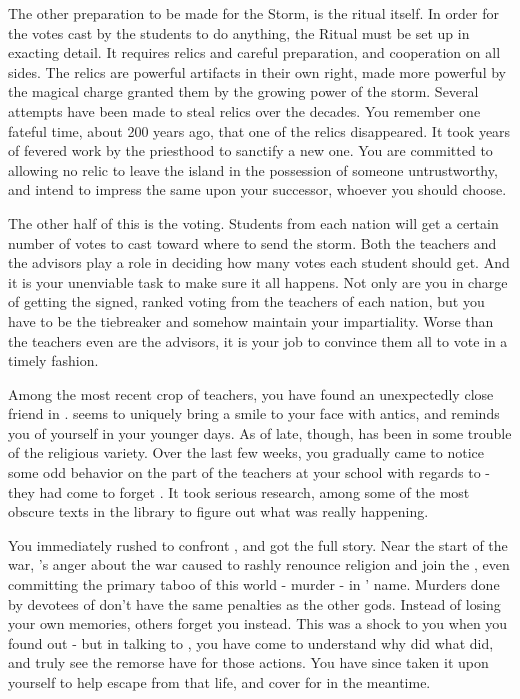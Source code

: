 \documentclass[char]{GL2020}
\begin{document}
The other preparation to be made for the Storm, is the ritual itself. In order for the votes cast by the students to do anything, the Ritual must be set up in exacting detail. It requires relics and careful preparation, and cooperation on all sides. The relics are powerful artifacts in their own right, made more powerful by the magical charge granted them by the growing power of the storm. Several attempts have been made to steal relics over the decades. You remember one fateful time, about 200 years ago, that one of the \pFarm{} relics disappeared. It took years of fevered work by the priesthood to sanctify a new one. You are committed to allowing no relic to leave the island in the possession of someone untrustworthy, and intend to impress the same upon your successor, whoever you should choose.

The other half of this is the voting. Students from each nation will get a certain number of votes to cast toward where to send the storm. Both the teachers and the advisors play a role in deciding how many votes each student should get. And it is your unenviable task to make sure it all happens. Not only are you in charge of getting the signed, ranked voting from the teachers of each nation, but you have to be the tiebreaker and somehow maintain your impartiality. Worse than the teachers even are the advisors, it is your job to convince them all to vote in a timely fashion.

Among the most recent crop of teachers, you have found an unexpectedly close friend in \cChupAvenger{}. \cChupAvenger{} seems to uniquely bring a smile to your face with \cChupAvenger{\their} antics, and reminds you of yourself in your younger days. As of late, though, \cChupAvenger{} has been in some trouble of the religious variety. Over the last few weeks, you gradually came to notice some odd behavior on the part of the teachers at your school with regards to \cChupAvenger{} - they had come to forget \cChupAvenger{\them}. It took serious research, among some of the most obscure texts in the library to figure out what was really happening. 

You immediately rushed to confront \cChupAvenger{}, and got the full story. Near the start of the war, \cChupAvenger{}’s anger about the war caused \cChupAvenger{\them} to rashly renounce \cChupAvenger{\their} religion and join the \pGoaties{}, even committing the primary taboo of this world - murder - in \cGenesis{}’ name. Murders done by devotees of \cGenesis{} don’t have the same penalties as the other gods. Instead of losing your own memories, others forget you instead. This was a shock to you when you found out - but in talking to \cChupAvenger{}, you have come to understand why \cChupAvenger{\they} did what \cChupAvenger{\they} did, and truly see the remorse \cChupAvenger{\they} have for those actions. You have since taken it upon yourself to help \cChupAvenger{} escape from that life, and cover for \cChupAvenger{\them} in the meantime.
\end{document}
